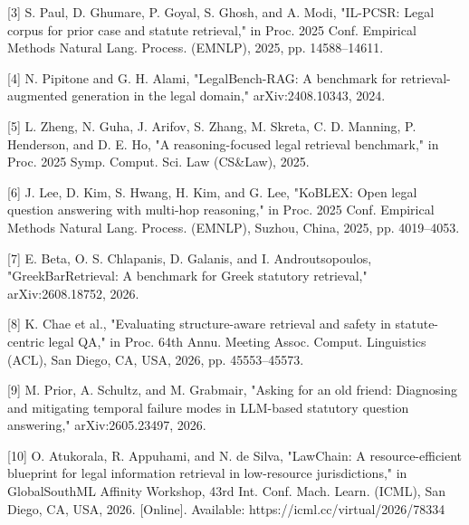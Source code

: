\documentclass[12pt,a4paper]{article}
\begin{document}
\hangindent=0.35in  \textnormal{[3]} S. Paul, D. Ghumare, P. Goyal, S. Ghosh, and A. Modi, "IL-PCSR: Legal corpus for prior case and statute retrieval," in Proc. 2025 Conf. Empirical Methods Natural Lang. Process. (EMNLP), 2025, pp. 14588–14611.\par

\hangindent=0.35in  \textnormal{[4]} N. Pipitone and G. H. Alami, "LegalBench-RAG: A benchmark for retrieval-augmented generation in the legal domain," arXiv:2408.10343, 2024.\par

\hangindent=0.35in  \textnormal{[5]} L. Zheng, N. Guha, J. Arifov, S. Zhang, M. Skreta, C. D. Manning, P. Henderson, and D. E. Ho, "A reasoning-focused legal retrieval benchmark," in Proc. 2025 Symp. Comput. Sci. Law (CS\&Law), 2025.\par

\hangindent=0.35in  \textnormal{[6]} J. Lee, D. Kim, S. Hwang, H. Kim, and G. Lee, "KoBLEX: Open legal question answering with multi-hop reasoning," in Proc. 2025 Conf. Empirical Methods Natural Lang. Process. (EMNLP), Suzhou, China, 2025, pp. 4019–4053.\par

\hangindent=0.35in  \textnormal{[7]} E. Beta, O. S. Chlapanis, D. Galanis, and I. Androutsopoulos, "GreekBarRetrieval: A benchmark for Greek statutory retrieval," arXiv:2608.18752, 2026.\par

\hangindent=0.35in  \textnormal{[8]} K. Chae et al., "Evaluating structure-aware retrieval and safety in statute-centric legal QA," in Proc. 64th Annu. Meeting Assoc. Comput. Linguistics (ACL), San Diego, CA, USA, 2026, pp. 45553–45573.\par

\hangindent=0.35in  \textnormal{[9]} M. Prior, A. Schultz, and M. Grabmair, "Asking for an old friend: Diagnosing and mitigating temporal failure modes in LLM-based statutory question answering," arXiv:2605.23497, 2026.\par

\hangindent=0.35in  \textnormal{[10]} O. Atukorala, R. Appuhami, and N. de Silva, "LawChain: A resource-efficient blueprint for legal information retrieval in low-resource jurisdictions," in GlobalSouthML Affinity Workshop, 43rd Int. Conf. Mach. Learn. (ICML), San Diego, CA, USA, 2026. [Online]. Available: https://icml.cc/virtual/2026/78334\par
\end{document}
